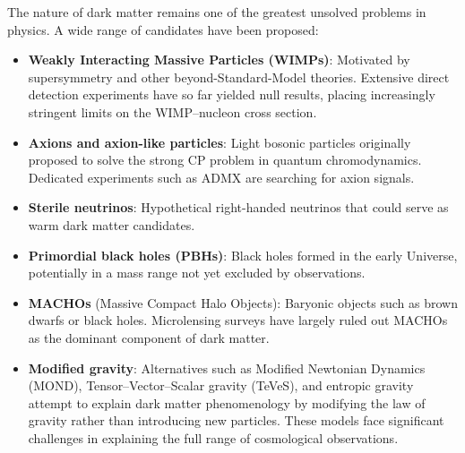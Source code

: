 The nature of dark matter remains one of the greatest unsolved problems in physics. A wide range of candidates have been proposed:
\begin{itemize}
    \item \textbf{Weakly Interacting Massive Particles (WIMPs)}: Motivated by supersymmetry and other beyond-Standard-Model theories. Extensive direct detection experiments have so far yielded null results, placing increasingly stringent limits on the WIMP--nucleon cross section.
    \item \textbf{Axions and axion-like particles}: Light bosonic particles originally proposed to solve the strong CP problem in quantum chromodynamics. Dedicated experiments such as ADMX are searching for axion signals.
    \item \textbf{Sterile neutrinos}: Hypothetical right-handed neutrinos that could serve as warm dark matter candidates.
    \item \textbf{Primordial black holes (PBHs)}: Black holes formed in the early Universe, potentially in a mass range not yet excluded by observations.
    \item \textbf{MACHOs} (Massive Compact Halo Objects): Baryonic objects such as brown dwarfs or black holes. Microlensing surveys have largely ruled out MACHOs as the dominant component of dark matter.
    \item \textbf{Modified gravity}: Alternatives such as Modified Newtonian Dynamics (MOND), Tensor--Vector--Scalar gravity (TeVeS), and entropic gravity attempt to explain dark matter phenomenology by modifying the law of gravity rather than introducing new particles. These models face significant challenges in explaining the full range of cosmological observations.
\end{itemize}


